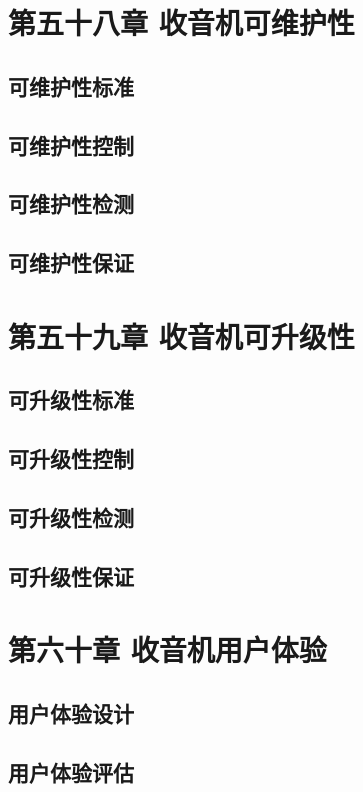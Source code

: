 \documentclass[12pt,UTF8]{ctexbook}
\begin{document}
\chapter{第五十八章 收音机可维护性}

\section{可维护性标准}
\section{可维护性控制}
\section{可维护性检测}
\section{可维护性保证}

\chapter{第五十九章 收音机可升级性}

\section{可升级性标准}
\section{可升级性控制}
\section{可升级性检测}
\section{可升级性保证}

\chapter{第六十章 收音机用户体验}

\section{用户体验设计}
\section{用户体验评估}
\end{document}
